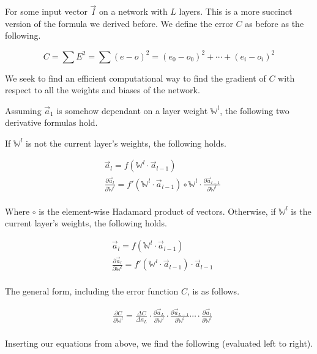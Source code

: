\documentclass[8pt]{amsart}
\newcommand\mat[1]{\mathbb{#1}}
\begin{document}
For some input vector $\vec{I}$ on a network with $L$ layers. This is a more
succinct version of the formula we derived before. We define the error $C$ as
before as the following.

\[
    C = \sum E^2 = \sum (e - o)^2 = (e_0 - o_0)^2 + \cdots + (e_i - o_i)^2
\]

We seek to find an efficient computational way to find the gradient of $C$ with
respect to all the weights and biases of the network.

Assuming $\vec{a}_1$ is somehow dependant on a layer weight $\mat{W}^l$, the following two
derivative formulas hold.

If $\mat{W}^l$ is not the current layer's weights, the following holds.

\[
    \begin{aligned}
        & \vec{a}_l = f(\mat{W}^l \cdot \vec{a}_{l - 1}) \\
        & \frac{ \partial \vec{a}_l }{ \partial \mat{W}^l } =
            f'(\mat{W}^l \cdot \vec{a}_{l - 1}) \circ \mat{W}^l
            \cdot \frac{ \partial \vec{a}_{l - 1} }{ \partial \mat{W}^l } \\
    \end{aligned}
\]

Where $\circ$ is the element-wise Hadamard product of vectors. Otherwise, if $\mat{W}^l$
is the current layer's weights, the following holds.

\[
    \begin{aligned}
        & \vec{a}_l = f(\mat{W}^l \cdot \vec{a}_{l - 1}) \\
        & \frac{ \partial \vec{a}_l }{ \partial \mat{W}^l } =
            f'(\mat{W}^l \cdot \vec{a}_{l - 1}) \cdot \vec{a}_{l - 1} \\
    \end{aligned}
\]

The general form, including the error function $C$, is as follows.

\[
    \begin{aligned}
        & \frac{ \partial C }{ \partial \mat{W}^l } = \frac{ \Delta C }{ \Delta a_L }
            \cdot \frac{ \partial \vec{a}_L }{ \partial \mat{W}^l }
            \cdot \frac{ \partial \vec{a}_{L - 1} }{ \partial \mat{W}^l }
            \cdots
            \cdot \frac{ \partial \vec{a}_l }{ \partial \mat{W}^l } \\
    \end{aligned}
\]

Inserting our equations from above, we
find the following (evaluated left to right).
\end{document}
